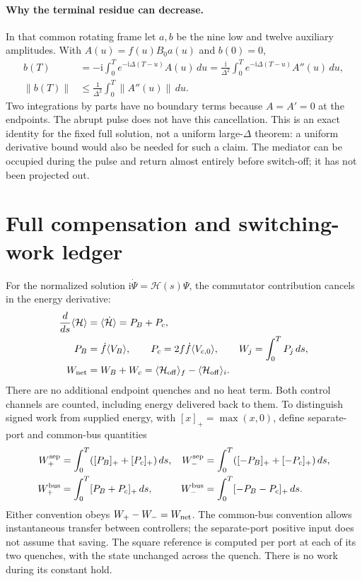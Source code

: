 \documentclass[11pt,a4paper]{article}
\newcommand{\ii}{\mathrm i}
\begin{document}
\paragraph{Why the terminal residue can decrease.}
In that common rotating frame let $a,b$ be the nine low and twelve
auxiliary amplitudes. With $A(u)=f(u)B_0a(u)$ and $b(0)=0$,
\begin{align}
 b(T)&=-\ii\int_0^T e^{-\ii\Delta(T-u)}A(u)\,du
      =\frac{\ii}{\Delta^2}\int_0^T e^{-\ii\Delta(T-u)}A''(u)\,du,\\
 \|b(T)\|&\le\frac1{\Delta^2}\int_0^T\|A''(u)\|\,du.\label{boundary-bound}
\end{align}
Two integrations by parts have no boundary terms because $A=A'=0$
at the endpoints. The abrupt pulse does not have this cancellation.
This is an exact identity for the fixed full solution, not a uniform
large-$\Delta$ theorem: a uniform derivative bound would also be needed
for such a claim. The mediator can be occupied during the pulse and
return almost entirely before switch-off; it has not been projected out.

\newpage
\section{Full compensation and switching-work ledger}
For the normalized solution $\ii\dot\Psi=\mathcal H(s)\Psi$,
the commutator contribution cancels in the energy derivative:
\begin{align}
 \frac{d}{ds}\langle\mathcal H\rangle
 &=\langle\dot{\mathcal H}\rangle=P_B+P_c,\\
 P_B&=\dot f\langle V_B\rangle,\qquad
 P_c=2f\dot f\langle V_{c,0}\rangle,\qquad
 W_j=\int_0^T P_j\,ds,\\
 W_{\rm net}&=W_B+W_c
 =\langle\mathcal H_{\rm off}\rangle_f-
   \langle\mathcal H_{\rm off}\rangle_i.\label{smooth-work}
\end{align}
There are no additional endpoint quenches and no heat term. Both
control channels are counted, including energy delivered back to them.
To distinguish signed work from supplied energy, with $[x]_+=\max(x,0)$,
define separate-port and common-bus quantities
\begin{align}
 W_+^{\rm sep}&=\int_0^T([P_B]_++[P_c]_+)\,ds,&
 W_-^{\rm sep}&=\int_0^T([-P_B]_++[-P_c]_+)\,ds,\\
 W_+^{\rm bus}&=\int_0^T[P_B+P_c]_+\,ds,&
 W_-^{\rm bus}&=\int_0^T[-P_B-P_c]_+\,ds.
\end{align}
Either convention obeys $W_+-W_-=W_{\rm net}$. The common-bus convention
allows instantaneous transfer between controllers; the separate-port
positive input does not assume that saving. The square reference is
computed per port at each of its two quenches, with the state unchanged
across the quench. There is no work during its constant hold.
\end{document}
